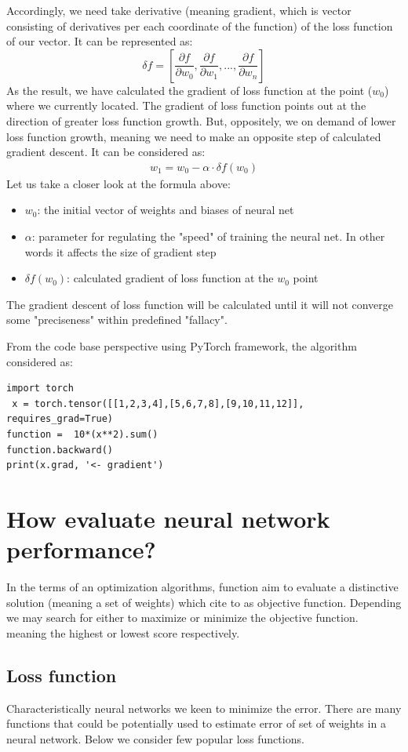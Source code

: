 \documentclass{article}
\begin{document}
Accordingly, we need take derivative (meaning gradient, which is vector consisting of derivatives per each coordinate of the function) of the loss function of our vector. It can be represented as:
\[ \delta{f} = [\frac{\partial{f}}{\partial{w_0}}, \frac{\partial{f}}{\partial{w_1}}, ... ,\frac{\partial{f}}{\partial{w_n}} ] \]
As the result, we have calculated the gradient of loss function at the point ($w_0$) where we currently located. The gradient of loss function points out at the direction of greater loss function growth. But, oppositely, we on demand of lower loss function growth, meaning we need to make an opposite step of calculated gradient descent. It can be considered as:
\begin{align*}
w_1 = w_0 - \alpha \cdot \delta{f(w_0)}
\end{align*}
Let us take a closer look at the formula above:
\begin{itemize}
    \item $w_0$: the initial vector of weights and biases of neural net
    \item $\alpha$: parameter for regulating the "speed" of training the neural net. In other words it affects the size of gradient step 
    \item $\delta{f(w_0)}$: calculated gradient of loss function at the $w_0$ point 
\end{itemize}
The gradient descent of loss function will be calculated until it will not converge some "preciseness" within predefined "fallacy".


From the code base perspective using PyTorch framework, the algorithm considered as:
\begin{lstlisting}
import torch
 x = torch.tensor([[1,2,3,4],[5,6,7,8],[9,10,11,12]],                requires_grad=True) 
function =  10*(x**2).sum()
function.backward()
print(x.grad, '<- gradient')
\end{lstlisting}

\section{How evaluate neural network performance?}
In the terms of an optimization algorithms, function aim to evaluate a distinctive solution (meaning a set of weights) which cite to as objective function. Depending we may search for either to maximize or minimize the objective function. meaning the highest or lowest score respectively.
\subsection{Loss function}
Characteristically neural networks we keen to minimize the error. There are many functions that could be potentially used to estimate error of set of weights in a neural network. Below we consider few popular loss functions.
\end{document}
